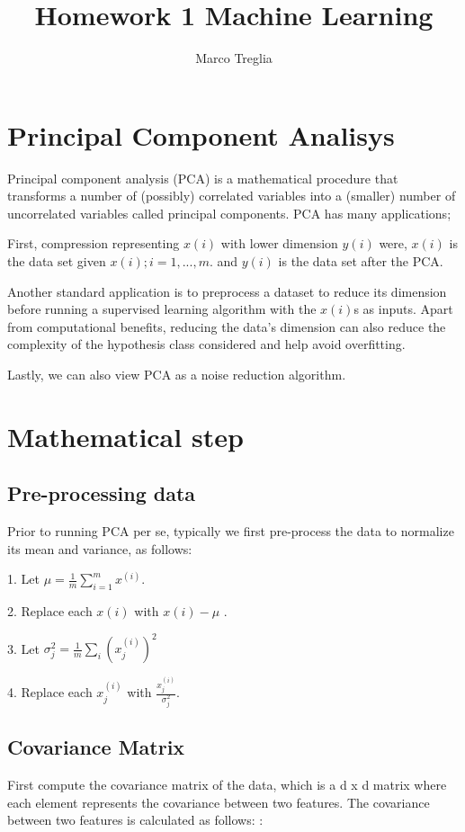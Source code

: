 \documentclass[11pt]{article}
\begin{document}
\title{Homework 1 Machine Learning}
\author{Marco Treglia}
\date{}
\maketitle

\section{Principal Component Analisys}
Principal component analysis (PCA) is a mathematical procedure that transforms a number of (possibly) correlated variables into a (smaller) number of uncorrelated variables called principal components. PCA has many applications;

First, compression representing $x(i)$  with lower dimension $y(i)$ were, $x(i)$  is the data set given ${x(i); i = 1, . . . , m}$. and $y(i)$  is the data set after the PCA.

Another standard application is to preprocess a dataset to reduce its dimension before running a supervised learning  algorithm with the $x(i)$s as inputs. Apart from computational benefits, reducing the data’s dimension can also reduce the complexity of the hypothesis class considered and help avoid overfitting.

Lastly, we can also view PCA as a noise reduction algorithm.

\section{Mathematical step}


\subsection{Pre-processing data}
Prior to running PCA per se, typically we first pre-process the data to normalize its mean and variance, as follows:

1. Let $\mu=\frac{1}{m} \sum\limits_{i=1}^m x^{(i)}.$

2. Replace each $x(i)$ with $x(i) - \mu$ .

3. Let $\sigma^2_{j} = \frac{1}{m} \sum\limits_{i} (x^{(i)}_{j})^2$

4. Replace each $x^{(i)}_{j}$ with $\frac{x^{(i)}_{j}}{\sigma^2_{j}}$.

\subsection{Covariance Matrix}
First compute the covariance matrix of the data,  which is a d x d  matrix where each element represents the covariance between two features. The covariance between two features is calculated as follows: :
\end{document}

